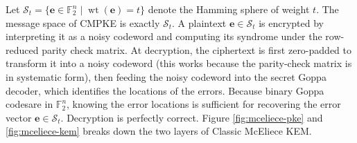 \documentclass[runningheads]{llncs}
\newcommand{\wt}{\mathop{wt}}
\begin{document}
Let $\mathcal{S}_t = \{\mathbf{e} \in \mathbb{F}_2^n \mid \wt(\mathbf{e}) = t\}$ denote the Hamming sphere of weight $t$. The message space of CMPKE is exactly $\mathcal{S}_t$. A plaintext $\mathbf{e}\in\mathcal{S}_t$ is encrypted by interpreting it as a noisy codeword and computing its syndrome under the row-reduced parity check matrix. At decryption, the ciphertext is first zero-padded to transform it into a noisy codeword (this works because the parity-check matrix is in systematic form), then feeding the noisy codeword into the secret Goppa decoder, which identifies the locations of the errors. Because binary Goppa codesare in $\mathbb{F}_2^n$, knowing the error locations is sufficient for recovering the error vector $\mathbf{e}\in\mathcal{S}_t$. Decryption is perfectly correct. Figure \ref{fig:mceliece-pke} and \ref{fig:mceliece-kem} breaks down the two layers of Classic McEliece KEM.
\end{document}
